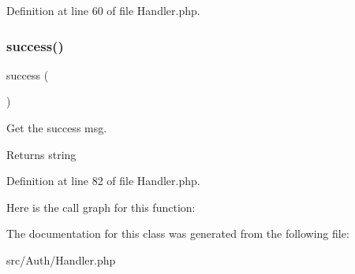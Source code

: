 Definition at line 60 of file Handler.\+php.

\mbox{\label{class_zest_1_1_auth_1_1_handler_ae3aaa78a09e613892295d90324f6a4c0}} 
\subsubsection{\texorpdfstring{success()}{success()}}
{\footnotesize\ttfamily success (\begin{DoxyParamCaption}{ }\end{DoxyParamCaption})}

Get the success msg.

\begin{DoxyReturn}{Returns}
string 
\end{DoxyReturn}


Definition at line 82 of file Handler.\+php.

Here is the call graph for this function\+:


The documentation for this class was generated from the following file\+:\begin{DoxyCompactItemize}
\item 
src/\+Auth/Handler.\+php\end{DoxyCompactItemize}
